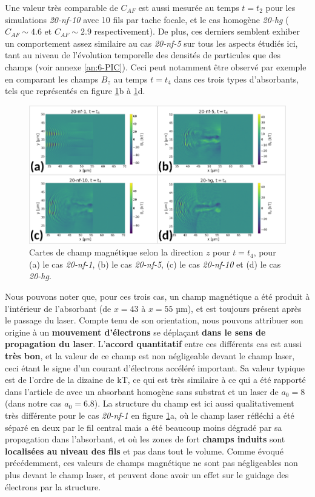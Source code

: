 \begin{refsection}
Une valeur très comparable de $C_{AF}$ est aussi mesurée au temps $t=t_2$ pour les simulations \textit{20-nf-10} avec 10 fils par tache focale, et le cas homogène \textit{20-hg} ($C_{AF}\sim 4.6$ et $C_{AF} \sim 2.9$ respectivement). De plus, ces derniers semblent exhiber un comportement assez similaire au cas \textit{20-nf-5} sur tous les aspects étudiés ici, tant au niveau de l'évolution temporelle des densités de particules que des champs (voir annexe \ref{an:6-PIC}). Ceci peut notamment être observé par exemple en comparant les champs $B_z$ au temps $t=t_4$ dans ces trois types d'absorbants, tels que représentés en figure \ref{fig:62-comparaison_Bz}b à \ref{fig:62-comparaison_Bz}d.

\begin{figure}[hbtp]
	\centering
	\includegraphics[width=0.75\linewidth]{6-opti_numerique/comparaison_I20_Bz_t4.png}
	\caption{Cartes de champ magnétique selon la direction $z$ pour $t=t_4$, pour (a) le cas \textit{20-nf-1}, (b) le cas \textit{20-nf-5}, (c) le cas \textit{20-nf-10} et (d) le cas \textit{20-hg}.}
	\label{fig:62-comparaison_Bz}
\end{figure}

Nous pouvons noter que, pour ces trois cas, un champ magnétique a été produit à l'intérieur de l'absorbant (de $x=43$ à $x=55$ µm), et est toujours présent après le passage du laser. Compte tenu de son orientation, nous pouvons attribuer son origine à un \textbf{mouvement d'électrons} se déplaçant \textbf{dans le sens de propagation du laser}. L'\textbf{accord quantitatif} entre ces différents cas est aussi \textbf{très bon}, et la valeur de ce champ est non négligeable devant le champ laser, ceci étant le signe d'un courant d'électrons accéléré important. Sa valeur typique est de l'ordre de la dizaine de kT, ce qui est très similaire à ce qui a été rapporté dans l'article de \cite{pazzaglia_2020} avec un absorbant homogène sans substrat et un laser de $a_0=8$ (dans notre cas $a_0=6.8$). La structure du champ est ici aussi qualitativement très différente pour le cas \textit{20-nf-1} en figure \ref{fig:62-comparaison_Bz}a, où le champ laser réfléchi a été séparé en deux par le fil central mais a été beaucoup moins dégradé par sa propagation dans l'absorbant, et où les zones de fort \textbf{champs induits} sont \textbf{localisées au niveau des fils} et pas dans tout le volume. Comme évoqué précédemment, ces valeurs de champs magnétique ne sont pas négligeables non plus devant le champ laser, et peuvent donc avoir un effet sur le guidage des électrons par la structure. 


\end{refsection}
